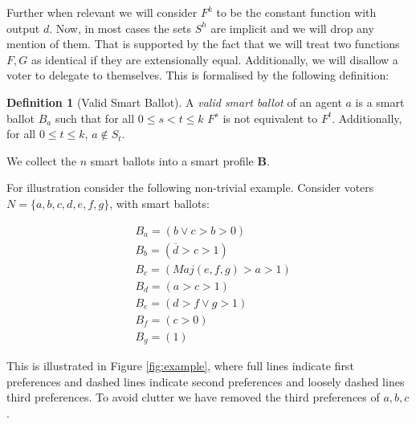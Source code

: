 \documentclass[11pt,a4paper, titlepage]{article}
\theoremstyle{definition}
\newtheorem{definition}[theorem]{Definition}
\newcommand{\Maj}{\mathit{Maj}}
\begin{document}
Further when relevant we will consider $F^{k}$ to be the constant function with output $d$. 
Now, in most cases the sets $S^h$ are implicit and we will drop any mention of them. 
That is supported by the fact that we will treat two functions $F, G$ as identical if they are extensionally equal. 
Additionally, we will disallow a voter to delegate to themselves. 
This is formalised by the following definition:

\begin{definition}[Valid Smart Ballot]
    A \emph{valid smart ballot} of an agent $a$ is a smart ballot $B_a$ such that for all $ 0 \leq s < t \leq k$ $F^s$ is not equivalent to $F^t$. Additionally, for all $0 \leq t \leq k$, $a \notin S_t$.
\end{definition}


We collect the $n$ smart ballots into a smart profile $\mathbf{B}$. 

For illustration consider the following non-trivial example.
Consider voters $N = \{a, b, c, d, e, f, g\}$, with smart ballots:

\begin{align*}
    &B_a =(b \lor c > b > 0) \\
    &B_b = \left(\overline{d} > c > 1 \right) \\
    &B_c = \left(\Maj(e, f, g) > a > 1 \right) \\
    &B_d = (a > c > 1) \\
    &B_e = (d > f \lor g > 1) \\
    &B_f = (c > 0) \\
    &B_g = (1)
\end{align*}

This is illustrated in Figure \ref{fig:example}, where full lines indicate first preferences and dashed lines indicate second preferences and loosely dashed lines third preferences. To avoid clutter we have removed the third preferences of $a, b, c$.
\end{document}
